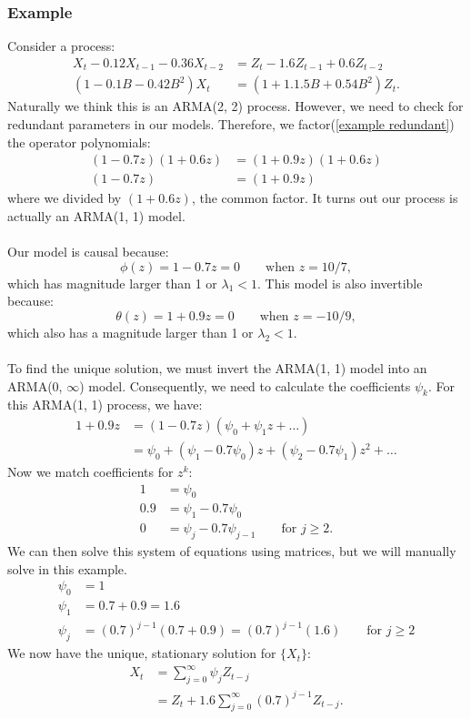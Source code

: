 \documentclass{article}
\begin{document}
\subsubsection{Example}
Consider a process:
\begin{align}\label{example redundant}
    X_t - 0.12X_{t-1}-0.36X_{t-2} &= Z_t - 1.6Z_{t-1}+0.6Z_{t-2}\nonumber\\
    (1-0.1B-0.42B^2)X_t &= (1+1.1.5B+0.54B^2)Z_t.
\end{align}
Naturally we think this is an ARMA(2, 2) process. However, we need to check for redundant parameters in our models. Therefore, we factor(\ref{example redundant}) the operator polynomials:
\begin{align}\label{reduced example}
    (1-0.7z)(1+0.6z) &= (1+0.9z)(1+0.6z)\nonumber\\
    (1-0.7z) &= (1+0.9z)
\end{align}
where we divided by $(1+0.6z)$, the common factor. It turns out our process is actually an ARMA(1, 1) model. \\\\
Our model is causal because:
\begin{equation}
    \phi(z) = 1-0.7z = 0 \qquad \text{when } z=10/7,
\end{equation}
which has magnitude larger than 1 or $\lambda_1 < 1$. This model is also invertible because:
\begin{equation}
    \theta(z) = 1+0.9z=0 \qquad \text{when } z=-10/9,
\end{equation}
which also has a magnitude larger than 1 or $\lambda_2 < 1$.\\\\
To find the unique solution, we must invert the ARMA(1, 1) model into an ARMA(0, $\infty$) model. Consequently, we need to calculate the coefficients $\psi_k$. For this ARMA(1, 1) process, we have:
\begin{align}\label{arma 1,1}
    1 + 0.9 z &= (1-0.7 z)(\psi_0+\psi_1 z +\ldots)\nonumber\\
    &= \psi_0 + (\psi_1-0.7\psi_0)z + (\psi_2-0.7\psi_1)z^2+\ldots\nonumber
\end{align}
Now we match coefficients for $z^k$:
\begin{align}
    1 &= \psi_0\nonumber\\
    0.9 &= \psi_1-0.7\psi_0\nonumber\\
    0&=\psi_j-0.7\psi_{j-1} \qquad \text{for } j\geq 2.\nonumber
\end{align}
We can then solve this system of equations using matrices, but we will manually solve in this example.
\begin{align}
    \psi_0 &= 1\nonumber\\
    \psi_1 &= 0.7 + 0.9=1.6\nonumber\\
    \psi_j &= (0.7)^{j-1}(0.7 + 0.9)=(0.7)^{j-1}(1.6) \qquad \text{for } j \geq2\nonumber
\end{align}
We now have the unique, stationary solution for $\{X_t\}$:
\begin{align}
    X_t &= \sum_{j=0}^{\infty} \psi_j Z_{t-j} \nonumber\\
    &=Z_t + 1.6\sum_{j=0}^{\infty}(0.7)^{j-1}Z_{t-j}.\nonumber
\end{align}
\end{document}
